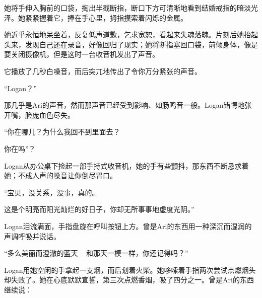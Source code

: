 \begin{scpbox}

她将手伸入胸前的口袋，掏出半截断指，断口下方可清晰地看到结婚戒指的暗淡光泽。她紧紧握着它，捧在手心里，拇指摸索着闪烁的金属。

她近乎永恒地呆坐着，反复低声道歉，乞求宽恕，看起来失魂落魄。片刻后她抬起头来，发现自己还在录音，好像回归了现实；她将断指塞回口袋，前倾身体，像是要关闭摄像机，但是这时一台收音机发出了声音。

它播放了几秒白噪音，而后突兀地传出了令你万分紧张的声音。

\end{scpbox}

\begin{scpdialog}
“Logan？”
\end{scpdialog}

\begin{scpbox}
那几乎是Ari的声音，然而那声音已经受到影响、如肠鸣音一般。Logan错愕地张开嘴，脸庞血色尽失。
\end{scpbox}

\begin{scpdialog}

“你在哪儿？为什么我回不到里面去？

你在吗”？

\end{scpdialog}


\begin{scpbox}
Logan从办公桌下捡起一部手持式收音机，她的手有些颤抖，那东西不断恳求着她；不成人声的嗓音让你倒尽胃口。
\end{scpbox}

\begin{scpdialog}
“宝贝，没关系，没事，真的。

这是个明亮而阳光灿烂的好日子，你却无所事事地虚度光阴。”
\end{scpdialog}

\begin{scpbox}
Logan泪流满面，手指盘旋在呼叫按钮上方。曾是Ari的东西用一种深沉而湿润的声调呼吸并说话。
\end{scpbox}

\begin{scpdialog}
“多么美丽而澄澈的蓝天 – 和那天一模一样，你还记得吗？”
\end{scpdialog}

\begin{scpbox}
Logan用她空闲的手拿起一支烟，而后划着火柴。她哆嗦着手指两次尝试点燃烟头却失败了。她在心底默默宣誓，第三次点燃香烟，吸了四分之一。曾是Ari的东西继续说：
\end{scpbox}

